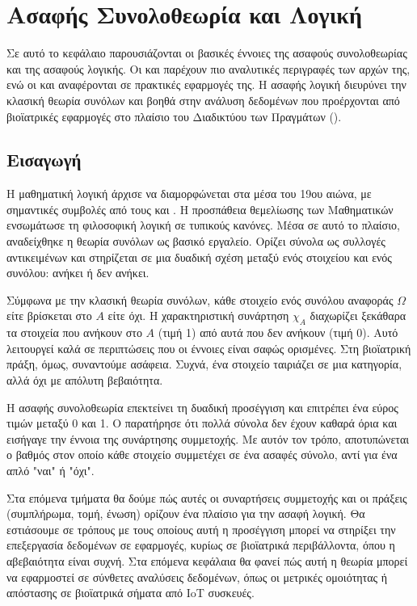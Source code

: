 \chapter{Ασαφής Συνολοθεωρία και Λογική}
\label{chap3}
Σε αυτό το κεφάλαιο παρουσιάζονται οι βασικές έννοιες της ασαφούς συνολοθεωρίας και της ασαφούς λογικής.
Οι  και  \cite{KlirYuan} παρέχουν πιο αναλυτικές περιγραφές των αρχών της, ενώ οι  και  \cite{Nguyen} αναφέρονται σε πρακτικές εφαρμογές της. 
Η ασαφής λογική διευρύνει την κλασική θεωρία συνόλων και βοηθά στην ανάλυση δεδομένων που προέρχονται από βιοϊατρικές εφαρμογές στο πλαίσιο του Διαδικτύου των Πραγμάτων ().

\section{Εισαγωγή}

Η μαθηματική λογική άρχισε να διαμορφώνεται στα μέσα του 19ου αιώνα, με σημαντικές συμβολές από τους  και . Η προσπάθεια θεμελίωσης των Μαθηματικών ενσωμάτωσε τη φιλοσοφική λογική σε τυπικούς κανόνες. Μέσα σε αυτό το πλαίσιο, αναδείχθηκε η θεωρία συνόλων ως βασικό εργαλείο. Ορίζει σύνολα ως συλλογές αντικειμένων και στηρίζεται σε μια δυαδική σχέση μεταξύ ενός στοιχείου και ενός συνόλου: ανήκει ή δεν ανήκει.

Σύμφωνα με την κλασική θεωρία συνόλων, κάθε στοιχείο ενός συνόλου αναφοράς \(\Omega\) είτε βρίσκεται στο \(A\) είτε όχι. Η χαρακτηριστική συνάρτηση \(\chi_A\) διαχωρίζει ξεκάθαρα τα στοιχεία που ανήκουν στο \(A\) (τιμή 1) από αυτά που δεν ανήκουν (τιμή 0). Αυτό λειτουργεί καλά σε περιπτώσεις που οι έννοιες είναι σαφώς ορισμένες. Στη βιοϊατρική πράξη, όμως, συναντούμε ασάφεια. Συχνά, ένα στοιχείο ταιριάζει σε μια κατηγορία, αλλά όχι με απόλυτη βεβαιότητα.

Η ασαφής συνολοθεωρία επεκτείνει τη δυαδική προσέγγιση και επιτρέπει ένα εύρος τιμών μεταξύ 0 και 1. Ο  \cite{Zadeh1965} παρατήρησε ότι πολλά σύνολα δεν έχουν καθαρά όρια και εισήγαγε την έννοια της συνάρτησης συμμετοχής. Με αυτόν τον τρόπο, αποτυπώνεται ο βαθμός στον οποίο κάθε στοιχείο συμμετέχει σε ένα ασαφές σύνολο, αντί για ένα απλό "ναι" ή "όχι".

Στα επόμενα τμήματα θα δούμε πώς αυτές οι συναρτήσεις συμμετοχής και οι πράξεις (συμπλήρωμα, τομή, ένωση) ορίζουν ένα πλαίσιο για την ασαφή λογική. Θα εστιάσουμε σε τρόπους με τους οποίους αυτή η προσέγγιση μπορεί να στηρίξει την επεξεργασία δεδομένων σε  εφαρμογές, κυρίως σε βιοϊατρικά περιβάλλοντα, όπου η αβεβαιότητα είναι συχνή.
Στα επόμενα κεφάλαια θα φανεί πώς αυτή η θεωρία μπορεί να εφαρμοστεί σε σύνθετες αναλύσεις δεδομένων, όπως οι μετρικές ομοιότητας ή απόστασης σε βιοϊατρικά σήματα από IoT συσκευές.


